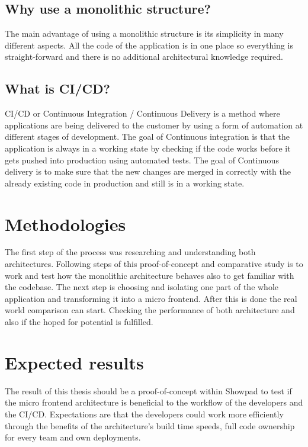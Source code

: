 \subsection{Why use a monolithic structure?}
The main advantage of using a monolithic structure is its simplicity in many different aspects. All the code of the application is in one place so everything is straight-forward and there is no additional architectural knowledge required.

\subsection{What is CI/CD?}
CI/CD or Continuous Integration / Continuous Delivery is a method where applications are being delivered to the customer by using a form of automation at different stages of development.
The goal of Continuous integration is that the application is always in a working state by checking if the code works before it gets pushed into production using automated tests.
The goal of Continuous delivery is to make sure that the new changes are merged in correctly with the already  existing code in production and still is in a working state.


\section{Methodologies}
\label{sec:methodologie}

The first step of the process was researching and understanding both architectures.
Following steps of this proof-of-concept and comparative study is to work and test how the monolithic architecture behaves also to get familiar with the codebase. The next step is choosing and isolating one part of the whole application and transforming it into a micro frontend. After this is done the real world comparison can start. Checking the performance of both architecture and also if the hoped for potential is fulfilled.

\section{Expected results}
\label{sec:verwachte_resultaten}

The result of this thesis should be a proof-of-concept within Showpad to test if the micro frontend architecture is beneficial to the workflow of the developers and the CI/CD.
Expectations are that the developers could work more efficiently through the benefits of the architecture's build time speeds, full code ownership for every team and own deployments.

